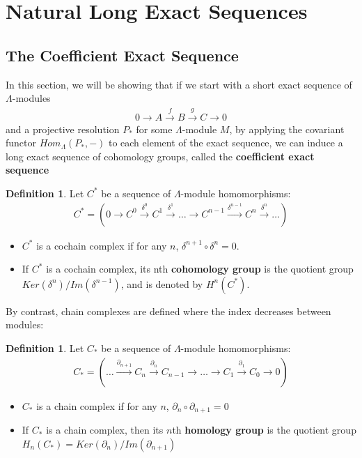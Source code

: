 \documentclass[12pt]{book}
\theoremstyle{definition}
\newtheorem{definition}[theorem]{Definition}
\begin{document}
\section{Natural Long Exact Sequences}
\subsection{The Coefficient Exact Sequence}
In this section, we will be showing that if we start with a short exact sequence of $\Lambda$-modules 
\begin{align*}
    0 \rightarrow A \xrightarrow{f} B \xrightarrow{g} C \rightarrow 0
\end{align*}
    and a projective resolution $P_*$ for some $\Lambda$-module $M$, by applying the covariant functor $Hom_\Lambda(P_*, -)$ to each element of the exact sequence, we can induce a long exact sequence of cohomology groups, called the \textbf{coefficient exact sequence}
\begin{definition}
    Let $C^*$ be a sequence of $\Lambda$-module homomorphisms: 
    \begin{align*}
        C^* = (0 \rightarrow C^0 \xrightarrow{\delta^0} C^1 \xrightarrow{\delta^1} \dots \rightarrow C^{n-1} \xrightarrow{\delta^{n-1}} C^n \xrightarrow{\delta^{n}} \dots)
    \end{align*}    
    \begin{itemize}
        \item $C^*$ is a cochain complex if for any $n$, $\delta^{n+1} \circ \delta^{n} = 0$. 
        \item If $C^*$ is a cochain complex, its nth \textbf{cohomology group} is the quotient group $Ker (\delta^{n})/Im(\delta^{n-1})$, and is denoted by $H^n(C^*)$.  
    \end{itemize}
\end{definition}

By contrast, chain complexes are defined where the index decreases between modules:

\begin{definition}
    Let $C_*$ be a sequence of $\Lambda$-module homomorphisms:
    \begin{align*}
        C_* = (\dots \xrightarrow{\partial_{n+1}} C_n \xrightarrow{\partial_n} C_{n-1} \rightarrow \dots \rightarrow C_1 \xrightarrow{\partial_1} C_0 \rightarrow 0)
    \end{align*}
    \begin{itemize}
        \item $C_*$ is a chain complex if for any $n$, $\partial_n \circ \partial_{n+1} = 0$
        \item If $C_*$ is a chain complex, then its $n$th \textbf{homology group} is the quotient group $H_n(C_*) = Ker(\partial_n) / Im(\partial_{n+1})$
    \end{itemize}
\end{definition}
\end{document}
